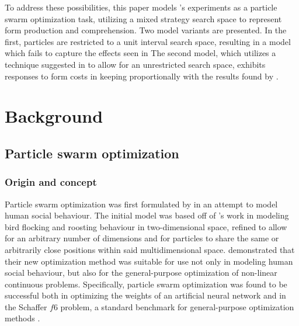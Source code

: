 \documentclass[12pt]{article}
\begin{document}
To address these possibilities, this paper models \citeauthor{rohde2012}'s experiments as a particle swarm optimization task, utilizing a mixed strategy search space to represent form production and comprehension. Two model variants are presented. In the first, particles are restricted to a unit interval search space, resulting in a model which fails to capture the effects seen in \citeauthor{rohde2012} The second model, which utilizes a technique suggested in \citealt[p.~252]{engelbrecht2005} to allow for an unrestricted search space, exhibits responses to form costs in keeping proportionally with the results found by \citeauthor{rohde2012}.



\section{Background}
\subsection{Particle swarm optimization}
\subsubsection{Origin and concept}
Particle swarm optimization was first formulated by \cite{kennedy1995} in an attempt to model human social behaviour. The initial model was based off of \cite{heppner1990}'s work in modeling bird flocking and roosting behaviour in two-dimensional space, refined to allow for an arbitrary number of dimensions and for particles to share the same or arbitrarily close positions within said multidimensional space. \citeauthor{kennedy1995} demonstrated that their new optimization method was suitable for use not only in modeling human social behaviour, but also for the general-purpose optimization of non-linear continuous problems. Specifically, particle swarm optimization was found to be successful both in optimizing the weights of an artificial neural network and in the Schaffer $f6$ problem, a standard benchmark for general-purpose optimization methods \citep{davis1991}.
\end{document}
